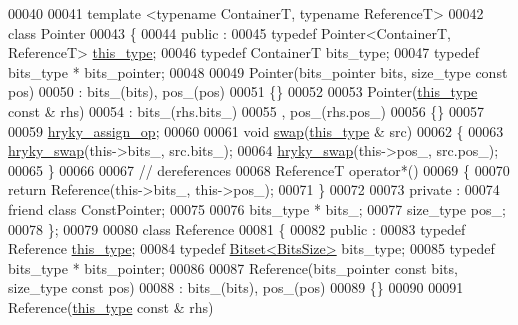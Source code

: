 \begin{DoxyCode}
00040 
00041     \textcolor{keyword}{template} <\textcolor{keyword}{typename} ContainerT, \textcolor{keyword}{typename} ReferenceT>
00042     \textcolor{keyword}{class }Pointer
00043     \{
00044     \textcolor{keyword}{public} :
00045         \textcolor{keyword}{typedef} Pointer<ContainerT, ReferenceT> \hyperlink{classhryky_1_1_bitset_a967bec88789e12e2ca96e7a73907822c}{this_type};
00046         \textcolor{keyword}{typedef} ContainerT bits\_type;
00047         \textcolor{keyword}{typedef} bits\_type * bits\_pointer;
00048 
00049         Pointer(bits\_pointer bits, size\_type \textcolor{keyword}{const} pos)
00050             : bits\_(bits), pos\_(pos)
00051         \{\}
00052 
00053         Pointer(\hyperlink{classhryky_1_1_bitset}{this_type} \textcolor{keyword}{const} & rhs)
00054             : bits\_(rhs.bits\_)
00055               , pos\_(rhs.pos\_)
00056         \{\}
00057 
00059         \hyperlink{classhryky_1_1_bitset_add97c3079f3c0f0ee7b39c40a4c8d498}{hryky_assign_op};
00060 
00061         \textcolor{keywordtype}{void} \hyperlink{classhryky_1_1_bitset_a85e9dae700136067e615b385ea8f4e14}{swap}(\hyperlink{classhryky_1_1_bitset}{this_type} & src)
00062         \{
00063             \hyperlink{namespacehryky_add9c1c1fdfda07cd47bcb7c16d3a823a}{hryky_swap}(this->bits\_, src.bits\_);
00064             \hyperlink{namespacehryky_add9c1c1fdfda07cd47bcb7c16d3a823a}{hryky_swap}(this->pos\_, src.pos\_);
00065         \}
00066 
00067         \textcolor{comment}{// dereferences}
00068         ReferenceT operator*()
00069         \{
00070             \textcolor{keywordflow}{return} Reference(this->bits\_, this->pos\_);
00071         \}
00072 
00073     \textcolor{keyword}{private} :
00074         \textcolor{keyword}{friend} \textcolor{keyword}{class }ConstPointer;
00075 
00076         bits\_type * bits\_;
00077         size\_type pos\_;
00078     \};
00079 
00080     \textcolor{keyword}{class }Reference
00081     \{
00082     \textcolor{keyword}{public} :
00083         \textcolor{keyword}{typedef} Reference \hyperlink{classhryky_1_1_bitset_a967bec88789e12e2ca96e7a73907822c}{this_type};
00084         \textcolor{keyword}{typedef} \hyperlink{classhryky_1_1_bitset}{Bitset<BitsSize>} bits\_type;
00085         \textcolor{keyword}{typedef} bits\_type * bits\_pointer;
00086         
00087         Reference(bits\_pointer \textcolor{keyword}{const} bits, size\_type \textcolor{keyword}{const} pos)
00088             : bits\_(bits), pos\_(pos)
00089         \{\}
00090 
00091         Reference(\hyperlink{classhryky_1_1_bitset_a967bec88789e12e2ca96e7a73907822c}{this_type} \textcolor{keyword}{const} & rhs)

\end{DoxyCode}
